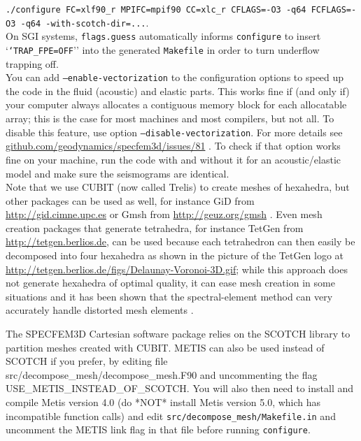 \noindent \texttt{./configure FC=xlf90\_r MPIFC=mpif90 CC=xlc\_r CFLAGS=\textquotedbl{}-O3
-q64\textquotedbl{} FCFLAGS=\textquotedbl{}-O3 -q64\textquotedbl{}
-with-scotch-dir=...}.\\


On SGI systems, \texttt{flags.guess} automatically informs \texttt{configure}
to insert `\texttt{`TRAP\_FPE=OFF}'' into the generated \texttt{Makefile}
in order to turn underflow trapping off.\\

You can add \texttt{--enable-vectorization} to the configuration options to speed up the code in the fluid (acoustic) and elastic parts.
This works fine if (and only if) your computer always allocates a contiguous memory block for each allocatable array;
this is the case for most machines and most compilers, but not all. To disable this feature, use option \texttt{--disable-vectorization}.
For more details see \href{https://github.com/geodynamics/specfem3d/issues/81}{github.com/geodynamics/specfem3d/issues/81} .
To check if that option works fine on your machine, run the code with and without it for an acoustic/elastic model and make sure the seismograms are identical.\\

Note that we use CUBIT (now called Trelis) to create meshes of hexahedra, but other packages
can be used as well, for instance GiD from \url{http://gid.cimne.upc.es}
or Gmsh from \url{http://geuz.org/gmsh} \citep{GeRe09}. Even mesh
creation packages that generate tetrahedra, for instance TetGen from
\url{http://tetgen.berlios.de}, can be used because each tetrahedron
can then easily be decomposed into four hexahedra as shown in the
picture of the TetGen logo at \url{http://tetgen.berlios.de/figs/Delaunay-Voronoi-3D.gif};
while this approach does not generate hexahedra of optimal quality,
it can ease mesh creation in some situations and it has been shown
that the spectral-element method can very accurately handle distorted
mesh elements \citep{OlSe11}.

The SPECFEM3D Cartesian software package relies on the SCOTCH library
to partition meshes created with CUBIT. METIS \citep{KaKu98a,KaKu98c,KaKu98b}
can also be used instead of SCOTCH if you prefer, by editing file
src/decompose\_mesh/decompose\_mesh.F90 and uncommenting the flag
USE\_METIS\_INSTEAD\_OF\_SCOTCH. You will also then need to install
and compile Metis version 4.0 (do {*}NOT{*} install Metis version
5.0, which has incompatible function calls) and edit \texttt{src/decompose\_mesh/Makefile.in}
and uncomment the METIS link flag in that file before running \texttt{configure}.\\


